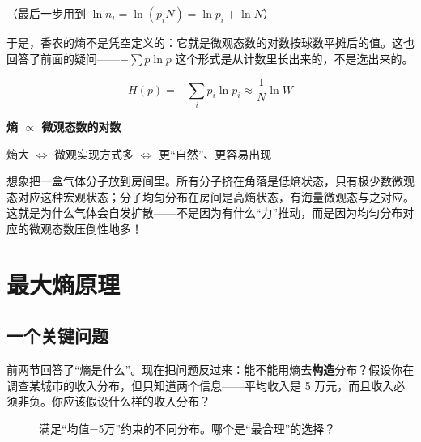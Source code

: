 （最后一步用到 $\ln n_i = \ln(p_i N) = \ln p_i + \ln N$）

于是，香农的熵不是凭空定义的：它就是微观态数的对数按球数平摊后的值。这也回答了前面的疑问——$-\sum p \ln p$ 这个形式是从计数里长出来的，不是选出来的。

\begin{keytheorem}[title=熵的组合学意义]
\begin{equation}
H(p) = -\sum_i p_i \ln p_i \approx \frac{1}{N} \ln W
\end{equation}

\textbf{熵 $\propto$ 微观态数的对数}

熵大 $\Leftrightarrow$ 微观实现方式多 $\Leftrightarrow$ 更“自然”、更容易出现
\end{keytheorem}

\begin{physicalmeaning}
想象把一盒气体分子放到房间里。所有分子挤在角落是低熵状态，只有极少数微观态对应这种宏观状态；分子均匀分布在房间是高熵状态，有海量微观态与之对应。这就是为什么气体会自发扩散——不是因为有什么“力”推动，而是因为均匀分布对应的微观态数压倒性地多！
\end{physicalmeaning}

\section{最大熵原理}

\subsection{一个关键问题}

前两节回答了“熵是什么”。现在把问题反过来：能不能用熵去\textbf{构造}分布？假设你在调查某城市的收入分布，但只知道两个信息——平均收入是 5 万元，而且收入必须非负。你应该假设什么样的收入分布？

\begin{figure}[htbp]
\centering
{}
\caption{满足“均值=5万”约束的不同分布。哪个是“最合理”的选择？}
\end{figure}

